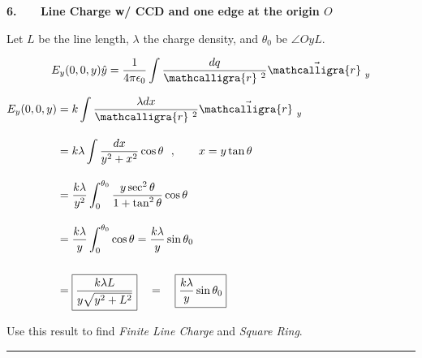 \documentclass[12pt]{article}
\newcommand{\scripty}[1]{\ensuremath{\mathcalligra{#1}}}
\newcommand*{\cursrr}{\scripty{r}\ }
\begin{document}
\newpage

\noindent
\begin{minipage}[t]{.48\textwidth}
	\vspace{20pt}	
	\textbf{6. \ \ \ Line Charge w/ CCD and one edge at the origin \(O\)}
	
	\vspace{10pt}	
	Let \(L\) be the line length, \(\lambda\) the charge density,
	and \(\theta_0\) be \(\angle OyL\).

	\vspace{5pt}
	\[ \displaystyle E_y(0,0,y) \hat{y} = \frac{1}{4 \pi \epsilon_0} \int \frac{dq}{\cursrr^2} \vec{\cursrr}_y\]

	\vspace{10pt}
	\(\begin{aligned}
		E_y(0,0,y) &= k \int \frac{\lambda dx}{\cursrr^2} \vec{\cursrr}_y\\[10pt]
		&= k \lambda \int \frac{ dx}{y^2 + x^2} \cos{\theta}
			\ \ , \hspace{20pt} x = y \tan{\theta}\\[10pt]
		&= \frac{k \lambda}{y^2} \int_0^{\theta_0} \frac{y \sec^2{\theta}}{1 + \tan^2{\theta}} \cos{\theta}\\[10pt]
		&= \frac{k \lambda}{y} \int_0^{\theta_0} \cos{\theta} = \frac{k \lambda}{y} \sin{\theta_0} \\[15pt]
		&= \boxed{ \frac{k \lambda L}{y \sqrt{y^2+L^2}} } \quad = \quad \boxed{ \frac{k \lambda}{y} \sin{\theta_0}}
	\end{aligned}\)

	\vspace{30pt}
	Use this result to find \textit{Finite Line Charge} and \textit{Square Ring}.
\end{minipage}
\hspace{0.01\textwidth}
\rule[-438pt]{.5pt}{430pt}
\hspace{0.01\textwidth}
\end{document}
